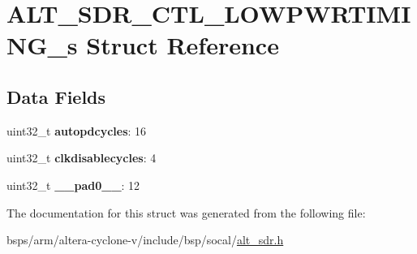 \hypertarget{structALT__SDR__CTL__LOWPWRTIMING__s}{}\section{A\+L\+T\+\_\+\+S\+D\+R\+\_\+\+C\+T\+L\+\_\+\+L\+O\+W\+P\+W\+R\+T\+I\+M\+I\+N\+G\+\_\+s Struct Reference}
\label{structALT__SDR__CTL__LOWPWRTIMING__s}
\subsection*{Data Fields}
\begin{DoxyCompactItemize}
\item 
\mbox{\label{structALT__SDR__CTL__LOWPWRTIMING__s_ab8735a2992d47f7dc68894a12602e9a1}} 
uint32\+\_\+t {\bfseries autopdcycles}\+: 16
\item 
\mbox{\label{structALT__SDR__CTL__LOWPWRTIMING__s_a7580ad17736b37e43f17c99a83145470}} 
uint32\+\_\+t {\bfseries clkdisablecycles}\+: 4
\item 
\mbox{\label{structALT__SDR__CTL__LOWPWRTIMING__s_a73899b6a13691cd6f49dfbadfebdbf7d}} 
uint32\+\_\+t {\bfseries \+\_\+\+\_\+pad0\+\_\+\+\_\+}\+: 12
\end{DoxyCompactItemize}


The documentation for this struct was generated from the following file\+:\begin{DoxyCompactItemize}
\item 
bsps/arm/altera-\/cyclone-\/v/include/bsp/socal/\mbox{\hyperlink{alt__sdr_8h}{alt\+\_\+sdr.\+h}}\end{DoxyCompactItemize}

